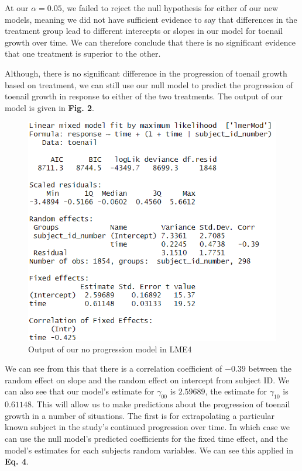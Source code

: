 \documentclass{article}
\begin{document}
At our $\alpha = 0.05$, we failed to reject the null hypothesis for either of our new models, meaning we did not have sufficient evidence to say that differences in the treatment group lead to different intercepts or slopes in our model for toenail growth over time. We can therefore conclude that there is no significant evidence that one treatment is superior to the other.

Although, there is no significant difference in the progression of toenail growth based on treatment, we can still use our null model to predict the progression of toenail growth in response to either of the two treatments. The output of our model is given in \textbf{Fig. 2}.

\begin{figure}[H]
\includegraphics[scale=0.7]{model.png}
\centering
\caption{Output of our no progression model in LME4}
\end{figure}

We can see from this that there is a correlation coefficient of $-0.39$ between the random effect on slope and the random effect on intercept from subject ID. We can also see that our model's estimate for $\gamma_{00}$ is $2.59689$, the estimate for $\gamma_{10}$ is $0.61148$. This will allow us to make predictions about the progression of toenail growth in a number of situations. The first is for extrapolating a particular known subject in the study's continued progression over time. In which case we can use the null model's predicted coefficients for the fixed time effect, and the model's estimates for each subjects random variables. We can see this applied in \textbf{Eq. 4}. 
\end{document}
